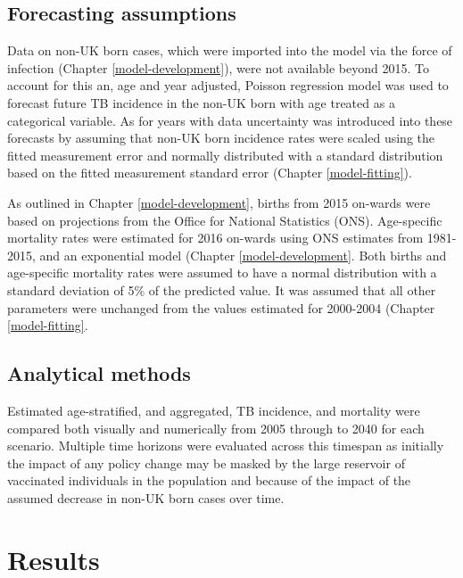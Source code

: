 \documentclass[11pt,twoside]{bristolthesis}
\begin{document}
  \hypertarget{forecasting-assumptions}{%
  \subsection{Forecasting assumptions}\label{forecasting-assumptions}}
  
  Data on non-UK born cases, which were imported into the model via the force of infection (Chapter \ref{model-development}), were not available beyond 2015. To account for this an, age and year adjusted, Poisson regression model was used to forecast future TB incidence in the non-UK born with age treated as a categorical variable. As for years with data uncertainty was introduced into these forecasts by assuming that non-UK born incidence rates were scaled using the fitted measurement error and normally distributed with a standard distribution based on the fitted measurement standard error (Chapter \ref{model-fitting}).
  
  As outlined in Chapter \ref{model-development}, births from 2015 on-wards were based on projections from the Office for National Statistics (ONS). Age-specific mortality rates were estimated for 2016 on-wards using ONS estimates from 1981-2015, and an exponential model (Chapter \ref{model-development}. Both births and age-specific mortality rates were assumed to have a normal distribution with a standard deviation of 5\% of the predicted value. It was assumed that all other parameters were unchanged from the values estimated for 2000-2004 (Chapter \ref{model-fitting}.
  
  \hypertarget{analytical-methods}{%
  \subsection{Analytical methods}\label{analytical-methods}}
  
  Estimated age-stratified, and aggregated, TB incidence, and mortality were compared both visually and numerically from 2005 through to 2040 for each scenario. Multiple time horizons were evaluated across this timespan as initially the impact of any policy change may be masked by the large reservoir of vaccinated individuals in the population and because of the impact of the assumed decrease in non-UK born cases over time.
  
  \hypertarget{results-4}{%
  \section{Results}\label{results-4}}
  
\end{document}
